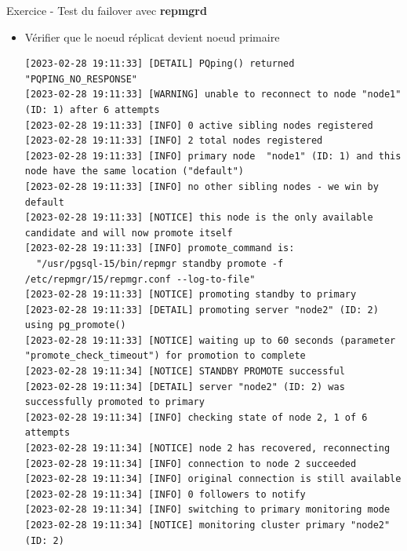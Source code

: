 
\begin{frame}[fragile]{Exercice - Test du failover avec \textbf{repmgrd}}

   \begin{itemize}
      \item Vérifier que le noeud réplicat devient noeud primaire
\begin{tiny}
\begin{Verbatim}[commandchars=\&\{\}]
[2023-02-28 19:11:33] [DETAIL] PQping() returned "PQPING_NO_RESPONSE"
[2023-02-28 19:11:33] [WARNING] unable to reconnect to node "node1" (ID: 1) after 6 attempts
[2023-02-28 19:11:33] [INFO] 0 active sibling nodes registered
[2023-02-28 19:11:33] [INFO] 2 total nodes registered
[2023-02-28 19:11:33] [INFO] primary node  "node1" (ID: 1) and this node have the same location ("default")
[2023-02-28 19:11:33] [INFO] no other sibling nodes - we win by default
[2023-02-28 19:11:33] [NOTICE] this node is the only available candidate and will now promote itself
[2023-02-28 19:11:33] [INFO] promote_command is:
  "/usr/pgsql-15/bin/repmgr standby promote -f /etc/repmgr/15/repmgr.conf --log-to-file"
[2023-02-28 19:11:33] [NOTICE] promoting standby to primary
[2023-02-28 19:11:33] [DETAIL] promoting server "node2" (ID: 2) using pg_promote()
[2023-02-28 19:11:33] [NOTICE] waiting up to 60 seconds (parameter "promote_check_timeout") for promotion to complete
[2023-02-28 19:11:34] [NOTICE] STANDBY PROMOTE successful
[2023-02-28 19:11:34] [DETAIL] server "node2" (ID: 2) was successfully promoted to primary
[2023-02-28 19:11:34] [INFO] checking state of node 2, 1 of 6 attempts
[2023-02-28 19:11:34] [NOTICE] node 2 has recovered, reconnecting
[2023-02-28 19:11:34] [INFO] connection to node 2 succeeded
[2023-02-28 19:11:34] [INFO] original connection is still available
[2023-02-28 19:11:34] [INFO] 0 followers to notify
[2023-02-28 19:11:34] [INFO] switching to primary monitoring mode
[2023-02-28 19:11:34] [NOTICE] monitoring cluster primary "node2" (ID: 2)
\end{Verbatim}
\end{tiny}
   \end{itemize}

\end{frame}



